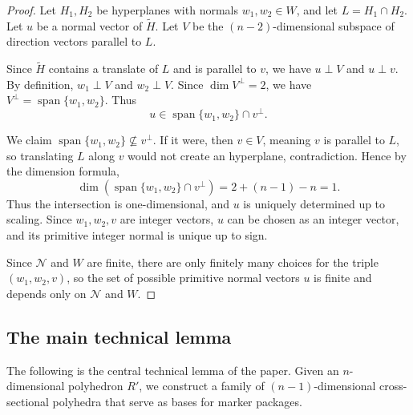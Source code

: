 \documentclass{amsart}
\theoremstyle{definition}
\begin{document}
\begin{proof}
Let $H_1, H_2$ be hyperplanes with normals $w_1, w_2\in W$, and let
$L=H_1\cap H_2$. Let $u$ be a normal vector of $\widetilde{H}$. Let $V$
be the $(n-2)$-dimensional subspace of direction vectors parallel to $L$.

Since $\widetilde{H}$ contains a translate of $L$ and is parallel to $v$,
we have $u\perp V$ and $u\perp v$. By definition, $w_1\perp V$ and
$w_2\perp V$. Since $\dim V^\perp=2$, we have
$V^\perp=\operatorname{span}\{w_1,w_2\}$. Thus
\[
u\in \operatorname{span}\{w_1,w_2\}\cap v^\perp.
\]

We claim $\operatorname{span}\{w_1,w_2\}\not\subseteq v^\perp$. If it were,
then $v\in V$, meaning $v$ is parallel to $L$, so translating $L$ along
$v$ would not create an hyperplane, contradiction.
Hence by the dimension formula,
\[
\dim(\operatorname{span}\{w_1,w_2\}\cap v^\perp)=2+(n-1)-n=1.
\]
Thus the intersection is one-dimensional, and $u$ is uniquely determined
up to scaling. Since $w_1, w_2, v$ are integer vectors, $u$ can be chosen
as an integer vector, and its primitive integer normal is unique up to sign.

Since $\mathcal{N}$ and $W$ are finite, there are only finitely many
choices for the triple $(w_1, w_2, v)$, so the set of possible primitive
normal vectors $u$ is finite and depends only on $\mathcal{N}$ and $W$.
\end{proof}

\subsection{The main technical lemma}

The following is the central technical lemma of the paper. Given an
$n$-dimensional polyhedron $R'$, we construct a family of
$(n-1)$-dimensional cross-sectional polyhedra that serve as bases for
marker packages.
\end{document}
